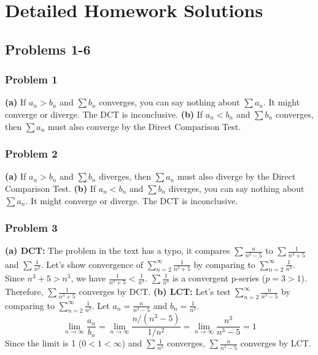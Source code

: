 \documentclass{article}
\begin{document}
\section{Detailed Homework Solutions}

\subsection{Problems 1-6}

\subsubsection*{Problem 1}
\textbf{(a)} If \(a_n > b_n\) and \(\sum b_n\) converges, you can say nothing about \(\sum a_n\). It might converge or diverge. The DCT is inconclusive.
\textbf{(b)} If \(a_n < b_n\) and \(\sum b_n\) converges, then \(\sum a_n\) must also converge by the Direct Comparison Test.

\subsubsection*{Problem 2}
\textbf{(a)} If \(a_n > b_n\) and \(\sum b_n\) diverges, then \(\sum a_n\) must also diverge by the Direct Comparison Test.
\textbf{(b)} If \(a_n < b_n\) and \(\sum b_n\) diverges, you can say nothing about \(\sum a_n\). It might converge or diverge. The DCT is inconclusive.

\subsubsection*{Problem 3}
\textbf{(a) DCT:} The problem in the text has a typo, it compares \(\sum \frac{n}{n^3-5}\) to \(\sum \frac{1}{n^3+5}\) and \(\sum \frac{1}{n^2}\). Let's show convergence of \(\sum_{n=2}^{\infty} \frac{1}{n^3+5}\) by comparing to \(\sum_{n=2}^{\infty} \frac{1}{n^3}\). Since \(n^3+5 > n^3\), we have \(\frac{1}{n^3+5} < \frac{1}{n^3}\). \(\sum \frac{1}{n^3}\) is a convergent p-series (\(p=3>1\)). Therefore, \(\sum \frac{1}{n^3+5}\) converges by DCT.
\textbf{(b) LCT:} Let's test \(\sum_{n=2}^{\infty} \frac{n}{n^3-5}\) by comparing to \(\sum_{n=2}^{\infty} \frac{1}{n^2}\). Let \(a_n = \frac{n}{n^3-5}\) and \(b_n = \frac{1}{n^2}\).
\[ \lim_{n \to \infty} \frac{a_n}{b_n} = \lim_{n \to \infty} \frac{n/(n^3-5)}{1/n^2} = \lim_{n \to \infty} \frac{n^3}{n^3-5} = 1 \]
Since the limit is 1 (\(0<1<\infty\)) and \(\sum \frac{1}{n^2}\) converges, \(\sum \frac{n}{n^3-5}\) converges by LCT.
\end{document}
